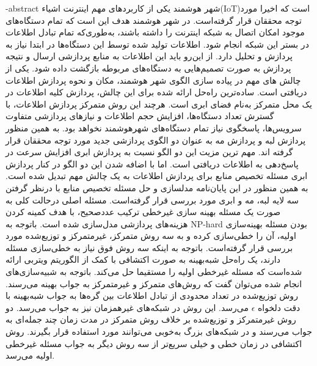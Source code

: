 \fa-abstract{
	شهر هوشمند یکی از کاربردهای مهم اینترنت اشیاء(IoT)است که اخیرا مورد توجه محققان قرار گرفته‌است. در شهر هوشمند هدف این است که تمام دستگاه‌های موجود امکان اتصال به شبکه اینترنت را داشته باشند، به‌طوری‌که تمام تبادل اطلاعات در بستر این شبکه انجام شود. 
	اطلاعات تولید شده توسط این دستگاه‌ها در ابتدا نیاز به پردازش و تحلیل دارد. از این‌رو باید این اطلاعات به منابع پردازشی ارسال و نتیجه پردازش به صورت تصمیم‌هایی به دستگاه‌های مربوطه بازگشت داده شود. 
	یکی از چالش های مهم در پیاده سازی الگوی شهر هوشمند، مکان و نحوه پردازش اطلاعات دریافتی است. ساده‌ترین راه‌حل‌ ارائه شده برای این چالش، پردازش کلیه‌ اطلاعات در یک محل متمرکز به‌نام فضای ابری است. هرچند این روش متمرکز پردازش اطلاعات، با گسترش تعداد دستگاه‌ها، افزایش حجم اطلاعات و نیازهای پردازشی متفاوت سرویس‌ها، پاسخگوی نیاز تمام دستگاه‌های شهرهوشمند نخواهد بود.
	به همین منظور پردازش لبه و پردازش مه به عنوان دو الگوی پردازشی جدید مورد توجه محققان قرار گرفته اند. مهم ترین مزیت این دو الگو نسبت به پردازش ابری افزایش سرعت در پاسخ‌دهی به اطلاعات دریافتی است. اما با اضافه شدن این دو الگو در کنار پردازش ابری مسئله تخصیص منابع برای پردازش اطلاعات به یک چالش مهم تبدیل شده است.
	به همین منظور در این پایان‌نامه مدلسازی و حل مسئله تخصیص منابع با درنظر گرفتن سه لایه لبه، مه و ابری مورد بررسی قرار گرفته‌است. مسئله اصلی درحالت کلی به صورت یک مسئله بهینه سازی غیرخطی ترکیب عددصحیح، با هدف کمینه کردن هزینه‌های پردازشی مدل‌سازی شده است. 
	باتوجه به NP-hard بودن مسئله بهینه‌سازی اولیه، آن را خطی‌سازی کرده و به سه روش متمرکز، غیرمتمرکز و توزیع‌شده مورد بررسی قرار گرفته‌است.
	باتوجه به اینکه سه روش فوق نیاز به خطی‌سازی مسئله دارند، یک راه‌حل شبه‌بهینه به صورت اکتشافی با کمک از الگوریتم ویتربی ارائه شده‌است که مسئله غیرخطی اولیه را مستقیما حل می‌کند.
	باتوجه به شبیه‌سازی‌های انجام شده می‌توان گفت که روش‌های متمرکز و غیرمتمرکز به جواب بهینه می‌رسند. روش توزیع‌شده در تعداد محدودی از تبادل اطلاعات بین گره‌ها به جواب شبه‌بهینه با دقت دلخواه $\epsilon$ می‌رسد. این روش در شبکه‌های غیرهمزمان نیز به جواب می‌رسد. دو روش غیرمتمرکز و توزیع‌شده بر خلاف روش متمرکز در مدت زمان چند جمله‌ای به جواب می‌رسند و در شبکه‌های بزرگ به‌خوبی می‌توانند مورد استفاده قرار بگیرند. روش اکتشافی در زمان خطی و خیلی سریع‌تر از سه روش دیگر به جواب مسئله غیرخطی اولیه می‌رسد.  
}

\cleartorightpage
\abstractPage

\cleartorightpage
